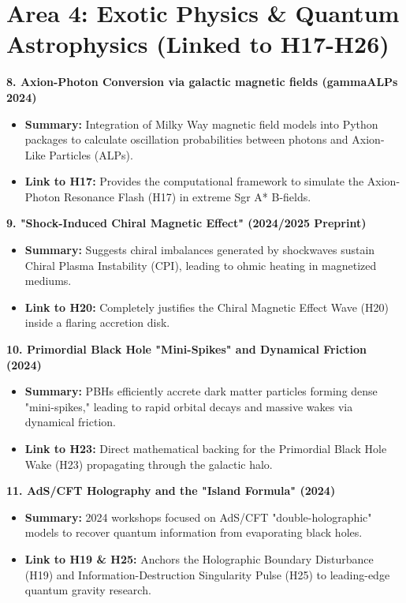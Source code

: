 \documentclass{article}
\begin{document}
\section*{Area 4: Exotic Physics \& Quantum Astrophysics (Linked to H17-H26)}

\textbf{8. Axion-Photon Conversion via galactic magnetic fields (gammaALPs 2024)}
\begin{itemize}
    \item \textbf{Summary:} Integration of Milky Way magnetic field models into Python packages to calculate oscillation probabilities between photons and Axion-Like Particles (ALPs).
    \item \textbf{Link to H17:} Provides the computational framework to simulate the Axion-Photon Resonance Flash (H17) in extreme Sgr A* B-fields.
\end{itemize}

\textbf{9. "Shock-Induced Chiral Magnetic Effect" (2024/2025 Preprint)}
\begin{itemize}
    \item \textbf{Summary:} Suggests chiral imbalances generated by shockwaves sustain Chiral Plasma Instability (CPI), leading to ohmic heating in magnetized mediums.
    \item \textbf{Link to H20:} Completely justifies the Chiral Magnetic Effect Wave (H20) inside a flaring accretion disk.
\end{itemize}

\textbf{10. Primordial Black Hole "Mini-Spikes" and Dynamical Friction (2024)}
\begin{itemize}
    \item \textbf{Summary:} PBHs efficiently accrete dark matter particles forming dense "mini-spikes," leading to rapid orbital decays and massive wakes via dynamical friction.
    \item \textbf{Link to H23:} Direct mathematical backing for the Primordial Black Hole Wake (H23) propagating through the galactic halo.
\end{itemize}

\textbf{11. AdS/CFT Holography and the "Island Formula" (2024)}
\begin{itemize}
    \item \textbf{Summary:} 2024 workshops focused on AdS/CFT "double-holographic" models to recover quantum information from evaporating black holes.
    \item \textbf{Link to H19 \& H25:} Anchors the Holographic Boundary Disturbance (H19) and Information-Destruction Singularity Pulse (H25) to leading-edge quantum gravity research.
\end{itemize}
\end{document}
